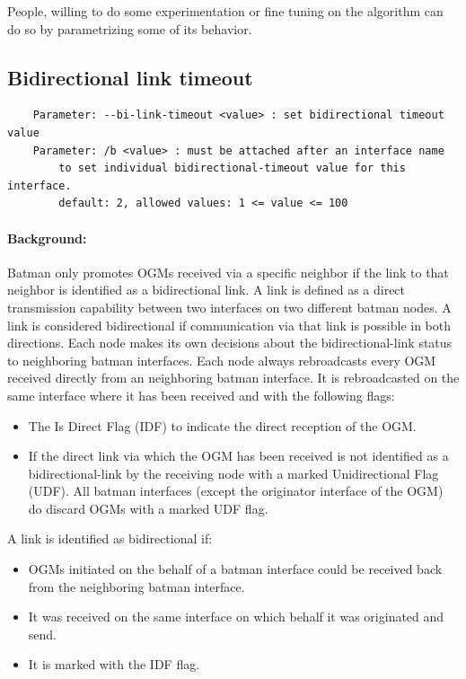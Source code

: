 \documentclass[11pt]{article}
\begin{document}
People, willing to do some experimentation or fine tuning on the algorithm can do so by parametrizing some of its behavior.


\subsection{Bidirectional link timeout}

\begin{small}
\begin{verbatim}
    Parameter: --bi-link-timeout <value> : set bidirectional timeout value
    Parameter: /b <value> : must be attached after an interface name
        to set individual bidirectional-timeout value for this interface.
        default: 2, allowed values: 1 <= value <= 100
\end{verbatim}
\end{small}

\paragraph{Background:} Batman only promotes OGMs received via a specific neighbor if the link to that neighbor is identified as a bidirectional link.
%
A link is defined as a direct transmission capability between two interfaces on two different batman nodes.
%
A link is considered bidirectional if communication via that link is possible in both directions.
Each node makes its own decisions about the bidirectional-link status to neighboring batman interfaces.
%
Each node always rebroadcasts every OGM received directly from an neighboring batman interface.
It is rebroadcasted on the same interface where it has been received and with the following flags:
\begin{itemize}

\item The Is Direct Flag (IDF) to indicate the direct reception of the OGM.

\item If the direct link via which the OGM has been received is not identified as a bidirectional-link by the receiving node with a marked Unidirectional Flag (UDF). All batman interfaces (except the originator interface of the OGM) do discard OGMs with a marked UDF flag.

\end{itemize}

A link is identified as bidirectional if:

\begin{itemize}
\item OGMs initiated on the behalf of a batman interface could be received back from the neighboring batman interface.
\item It was received on the same interface on which behalf it was originated and send.
\item It is marked with the IDF flag.
\end{itemize}
\end{document}

